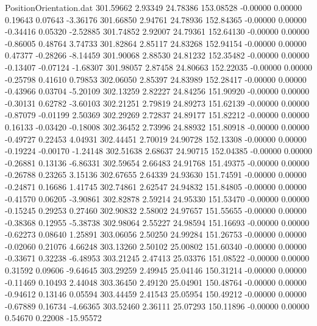 \begin{filecontents}{PositionOrientation.dat}
 301.59662    2.93349   24.78386   153.08528   -0.00000    0.00000    0.19643    0.07643   -3.36176
 301.66850    2.94761   24.78936   152.84365   -0.00000    0.00000   -0.34416    0.05320   -2.52885
 301.74852    2.92007   24.79361   152.64130   -0.00000    0.00000   -0.86005    0.48764    3.74733
 301.82864    2.85117   24.83268   152.94154   -0.00000    0.00000    0.47377   -0.28266   -8.14459
 301.90068    2.88530   24.81232   152.35482   -0.00000    0.00000   -0.13407   -0.07124   -1.68307
 301.98057    2.87458   24.80663   152.22035   -0.00000    0.00000   -0.25798    0.41610    0.79853
 302.06050    2.85397   24.83989   152.28417   -0.00000    0.00000   -0.43966    0.03704   -5.20109
 302.13259    2.82227   24.84256   151.90920   -0.00000    0.00000   -0.30131    0.62782   -3.60103
 302.21251    2.79819   24.89273   151.62139   -0.00000    0.00000   -0.87079   -0.01199    2.50369
 302.29269    2.72837   24.89177   151.82212   -0.00000    0.00000    0.16133   -0.03420   -0.18008
 302.36452    2.73996   24.88932   151.80918   -0.00000    0.00000   -0.49727    0.22453    4.04931
 302.44451    2.70019   24.90728   152.13308   -0.00000    0.00000   -0.19224   -0.00170   -1.24148
 302.51638    2.68637   24.90715   152.04385   -0.00000    0.00000   -0.26881    0.13136   -6.86331
 302.59654    2.66483   24.91768   151.49375   -0.00000    0.00000   -0.26788    0.23265    3.15136
 302.67655    2.64339   24.93630   151.74591   -0.00000    0.00000   -0.24871    0.16686    1.41745
 302.74861    2.62547   24.94832   151.84805   -0.00000    0.00000   -0.41570    0.06205   -3.90861
 302.82878    2.59214   24.95330   151.53470   -0.00000    0.00000   -0.15245    0.29253    0.27460
 302.90832    2.58002   24.97657   151.55655   -0.00000    0.00000   -0.38368    0.12955   -5.38738
 302.98064    2.55227   24.98594   151.16693   -0.00000    0.00000   -0.62273    0.08640    1.25891
 303.06056    2.50250   24.99284   151.26753   -0.00000    0.00000   -0.02060    0.21076    4.66248
 303.13260    2.50102   25.00802   151.60340   -0.00000    0.00000   -0.33671    0.32238   -6.48953
 303.21245    2.47413   25.03376   151.08522   -0.00000    0.00000    0.31592    0.09606   -9.64645
 303.29259    2.49945   25.04146   150.31214   -0.00000    0.00000   -0.11469    0.10493    2.44048
 303.36450    2.49120   25.04901   150.48764   -0.00000    0.00000   -0.94612    0.13146    0.05594
 303.44459    2.41543   25.05954   150.49212   -0.00000    0.00000   -0.67889    0.16734   -4.66365
 303.52460    2.36111   25.07293   150.11896   -0.00000    0.00000    0.54670    0.22008  -15.95572

\end{filecontents}
